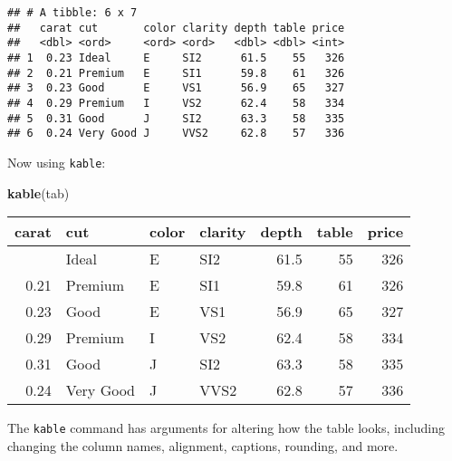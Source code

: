 \documentclass[
]{article}
\newenvironment{Shaded}{\begin{snugshade}}{\end{snugshade}}
\newcommand{\AttributeTok}[1]{\textcolor[rgb]{0.13,0.29,0.53}{#1}}
\newcommand{\FunctionTok}[1]{\textcolor[rgb]{0.13,0.29,0.53}{\textbf{#1}}}
\newcommand{\NormalTok}[1]{#1}
\newcommand{\OtherTok}[1]{\textcolor[rgb]{0.56,0.35,0.01}{#1}}
\newcommand{\StringTok}[1]{\textcolor[rgb]{0.31,0.60,0.02}{#1}}
\begin{document}
\begin{verbatim}
## # A tibble: 6 x 7
##   carat cut       color clarity depth table price
##   <dbl> <ord>     <ord> <ord>   <dbl> <dbl> <int>
## 1  0.23 Ideal     E     SI2      61.5    55   326
## 2  0.21 Premium   E     SI1      59.8    61   326
## 3  0.23 Good      E     VS1      56.9    65   327
## 4  0.29 Premium   I     VS2      62.4    58   334
## 5  0.31 Good      J     SI2      63.3    58   335
## 6  0.24 Very Good J     VVS2     62.8    57   336
\end{verbatim}

Now using \texttt{kable}:

\begin{Shaded}
\begin{Highlighting}[]
\FunctionTok{kable}\NormalTok{(tab)}
\end{Highlighting}
\end{Shaded}

\begin{longtable}[]{@{}rlllrrr@{}}
\toprule\noalign{}
carat & cut & color & clarity & depth & table & price \\
\midrule\noalign{}
\endhead
\bottomrule\noalign{}
\endlastfoot
0.23 & Ideal & E & SI2 & 61.5 & 55 & 326 \\
0.21 & Premium & E & SI1 & 59.8 & 61 & 326 \\
0.23 & Good & E & VS1 & 56.9 & 65 & 327 \\
0.29 & Premium & I & VS2 & 62.4 & 58 & 334 \\
0.31 & Good & J & SI2 & 63.3 & 58 & 335 \\
0.24 & Very Good & J & VVS2 & 62.8 & 57 & 336 \\
\end{longtable}

The \texttt{kable} command has arguments for altering how the table
looks, including changing the column names, alignment, captions,
rounding, and more.

\begin{Shaded}
\end{Shaded}
\end{document}
